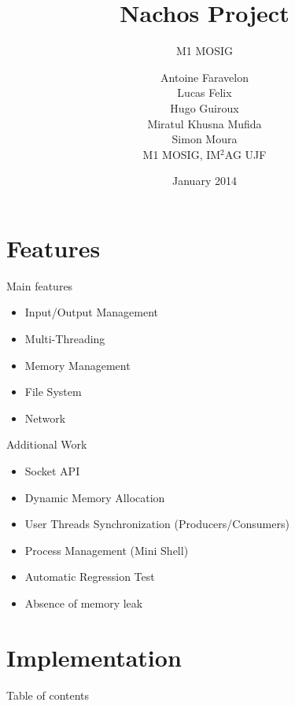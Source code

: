 \documentclass{beamer}
\title{Nachos Project}
\subtitle{M1 MOSIG}
\author{Antoine Faravelon
\\
Lucas Felix
\\
Hugo Guiroux
\\
Miratul Khusna Mufida
\\
Simon Moura
\\
M1 MOSIG, IM$^2$AG UJF 
}
\date{January 2014}
\begin{document}
\frame{\titlepage} 

\begin{frame}
    \tableofcontents
\end{frame}

\section{Features}

\begin{frame}{Main features}
    \begin{itemize}
        \item Input/Output Management
        \item Multi-Threading
        \item Memory Management
        \item File System
        \item Network
    \end{itemize}
\end{frame}

\begin{frame}{Additional Work}
    \begin{itemize}
        \item Socket API
        \item Dynamic Memory Allocation
        \item User Threads Synchronization (Producers/Consumers)
        \item Process Management (Mini Shell)
        \item Automatic Regression Test 
        \item Absence of memory leak
    \end{itemize}
\end{frame}

\section{Implementation}
\begin{frame}{Table of contents}
    \tableofcontents[currentsection]
\end{frame}
\end{document}
